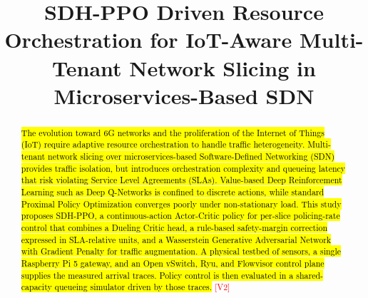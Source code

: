 \documentclass[conference]{IEEEtran}
\newcommand{\rev}[1]{\hl{#1}}
\begin{document}
\title{SDH-PPO Driven Resource Orchestration for IoT-Aware Multi-Tenant Network Slicing in Microservices-Based SDN}

\author{
\and
{}
}

\maketitle

\begin{abstract}
\rev{The evolution toward 6G networks and the proliferation of the Internet of Things (IoT) require adaptive resource orchestration to handle traffic heterogeneity. Multi-tenant network slicing over microservices-based Software-Defined Networking (SDN) provides traffic isolation, but introduces orchestration complexity and queueing latency that risk violating Service Level Agreements (SLAs). Value-based Deep Reinforcement Learning such as Deep Q-Networks is confined to discrete actions, while standard Proximal Policy Optimization converges poorly under non-stationary load. This study proposes SDH-PPO, a continuous-action Actor-Critic policy for per-slice policing-rate control that combines a Dueling Critic head, a rule-based safety-margin correction expressed in SLA-relative units, and a Wasserstein Generative Adversarial Network with Gradient Penalty for traffic augmentation. A physical testbed of sensors, a single Raspberry Pi 5 gateway, and an Open vSwitch, Ryu, and Flowvisor control plane supplies the measured arrival traces. Policy control is then evaluated in a shared-capacity queueing simulator driven by those traces.} \textcolor{red}{[V2]}
\end{abstract}
\end{document}
